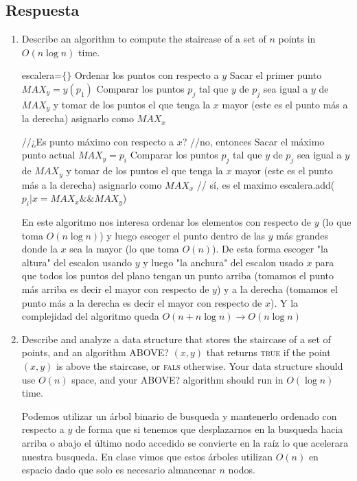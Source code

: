 \subsection*{Respuesta}
\begin{enumerate}
    \item Describe an algorithm to compute the staircase of a set of $n$ points in $O(n \log n)$ time.
    \begin{algorithmic}[1]
        \State escalera=$\{\}$
        \State Ordenar los puntos con respecto a $y$
        \State Sacar el primer punto $MAX_y = y(p_1)$
        \State Comparar los puntos $p_j$ tal que $y$ de $p_j$ sea igual a $y$ de $MAX_y$ y tomar de los puntos el que tenga la $x$ mayor (este es el punto más a la derecha) asignarlo como $MAX_x$ 

         //¿Es punto máximo con respecto a $x$?
            \State //no, entonces
            \State  Sacar el máximo punto actual $MAX_y = p_i$
            \State Comparar los puntos $p_j$ tal que $y$ de $p_j$ sea igual a $y$ de $MAX_y$ y tomar de los puntos el que tenga la $x$ mayor (este es el punto más a la derecha) asignarlo como $MAX_x$ 
         // sí, es el maximo
            \State escalera.add($p_i | x=MAX_x \&\& MAX_y$)
        \EndIf
        \EndFor
    \end{algorithmic}

        En este algoritmo nos interesa ordenar los elementos con respecto de $y$ (lo que toma $O(n \log n)$) y luego escoger el punto dentro de las $y$ más grandes donde la $x$ sea la mayor (lo que toma $O(n)$). De esta forma escoger "la altura" del escalon usando $y$ y luego "la anchura" del escalon usado $x$ para que todos los puntos del plano tengan un punto arriba (tomamos el punto más arriba es decir el mayor con respecto de $y$) y a la derecha (tomamos el punto más a la derecha es decir el mayor con respecto de $x$). Y la complejidad del algoritmo queda $O(n+n \log n)\rightarrow O(n \log n)$
    
    \item Describe and analyze a data structure that stores the staircase of a set of points, and an algorithm ABOVE? $(x, y)$ that returns \textsc{true} if the point $(x, y)$ is above the staircase, or \textsc{fals} otherwise. Your data structure should use $O(n)$ space, and your ABOVE? algorithm should run in $O(\log n)$ time.
    
    Podemos utilizar un árbol binario de busqueda y mantenerlo ordenado con respecto a $y$ de forma que si tenemos que desplazarnos en la busqueda hacia arriba o abajo el último nodo accedido se convierte en la raíz lo que acelerara nuestra busqueda. En clase vimos que estos árboles utilizan $O(n)$ en espacio dado que solo es necesario almancenar $n$ nodos.


\end{enumerate}
